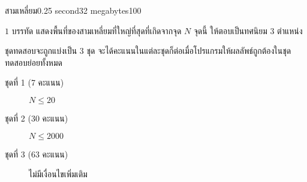 \documentclass[11pt,a4paper]{article}
\begin{document}
\begin{problem}{สามเหลี่ยม}{}{}{0.25 second}{32 megabytes}{100}
\OutputFile

$1$ บรรทัด แสดงพื้นที่ของสามเหลี่ยมที่ใหญ่ที่สุดที่เกิดจากจุด $N$ จุดนี้ ให้ตอบเป็นทศนิยม 3 ตำแหน่ง

\Scoring
ชุดทดสอบจะถูกแบ่งเป็น 3 ชุด จะได้คะแนนในแต่ละชุดก็ต่อเมื่อโปรแกรมให้ผลลัพธ์ถูกต้องในชุดทดสอบย่อยทั้งหมด
 
\begin{description}
\item[ชุดที่ 1 (7 คะแนน)] $N \leq 20$
\item[ชุดที่ 2 (30 คะแนน)] $N \leq 2000$
\item[ชุดที่ 3 (63 คะแนน)] ไม่มีเงื่อนไขเพิ่มเติม
\end{description}

\Examples

\begin{example}
%
\end{example}
 
\end{problem}
 
\end{document}
